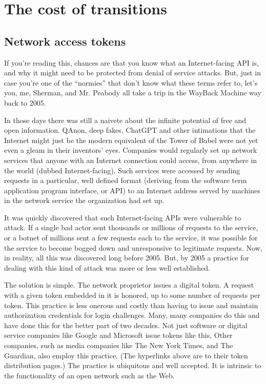 \section{The cost of transitions}
\subsection{Network access tokens}
If you’re reading this, chances are that you know what an Internet-facing API is, and why it might need to be protected from denial of service attacks. But, just in case you’re one of the “normies”  that don’t know what these terms refer to, let’s you, me, Sherman, and Mr. Peabody all take a trip in the WayBack Machine way back to 2005. 

In those days there was still a naivete about the infinite potential of free and open information. QAnon, deep fakes, ChatGPT and other intimations that the Internet might just be the modern equivalent of the Tower of Babel were not yet even a gleam in their inventors’ eyes. Companies would regularly set up network services that anyone with an Internet connection could access, from anywhere in the world (dubbed Internet-facing). Such services were accessed by sending requests in a particular, well defined format (deriving from the software term application program interface, or API) to an Internet address served by machines in the network service the organization had set up. 

It was quickly discovered that such Internet-facing APIs were vulnerable to attack. If a single bad actor sent thousands or millions of requests to the service, or a botnet of millions sent a few requests each to the service, it was possible for the service to become bogged down and unresponsive to legitimate requests. Now, in reality, all this was discovered long before 2005. But, by 2005 a practice for dealing with this kind of attack was more or less well established. 

The solution is simple. The network proprietor issues a digital token. A request with a given token embedded in it is honored, up to some number of requests per token. This practice is less onerous and costly than having to issue and maintain authorization credentials for login challenges. Many, many companies do this and have done this for the better part of two decades. Not just software or digital service companies like Google and Microsoft issue tokens like this,  Other companies, such as media companies like The New York Times, and The Guardian, also employ this practice. (The hyperlinks above are to their token distribution pages.) The practice is ubiquitous and well accepted. It is intrinsic to the functionality of an open network such as the Web.


